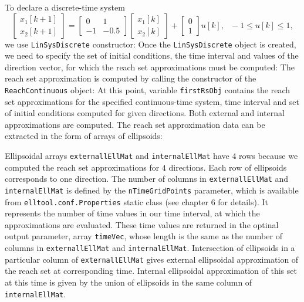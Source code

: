 To declare a discrete-time system
\[ \left[\begin{array}{c}
x_1[k+1]\\
x_2[k+1]\end{array}\right] = \left[\begin{array}{cc}
0 & 1\\
-1 & -0.5\end{array}\right]\left[\begin{array}{c}
x_1[k]\\
x_2[k]\end{array}\right] + \left[\begin{array}{c}
0\\
1\end{array}\right]u[k], ~~~ -1\leq u[k]\leq 1,\]
we use {\tt LinSysDiscrete} constructor:
Once the {\tt LinSysDiscrete} object is created, we need to specify the set
of initial conditions, the time interval and values of the direction vector,
for which the reach set approximations must be computed:
The reach set approximation is computed by calling the constructor
of the {\tt ReachContinuous} object:
At this point, variable {\tt firstRsObj} contains the reach set approximations for the
specified continuous-time system, time interval and set of initial conditions
computed for given directions. Both external and internal
approximations are computed.
The reach set approximation data can be
extracted in the form of arrays of ellipsoids:

Ellipsoidal arrays {\tt externallEllMat} and {\tt internalEllMat} have $4$ rows because we computed
the reach set approximations for $4$ directions. Each row of ellipsoids
corresponds to one direction. The number of columns in {\tt externallEllMat} and {\tt internalEllMat}
is defined by the {\tt nTimeGridPoints} parameter, which is available from {\tt elltool.conf.Properties}
static class (see chapter 6 for details). It represents the number of time values
in our time interval, at which the approximations are evaluated. These
time values are returned in the optinal output parameter, array {\tt timeVec},
whose length is the same as the number of columns in {\tt externallEllMat} and {\tt internalEllMat}.
Intersection of ellipsoids in a particular column of {\tt externallEllMat} gives
external ellipsoidal approximation of the reach set at corresponding time.
Internal ellipsoidal approximation of this set at this time is given by the
union of ellipsoids in the same column of {\tt internalEllMat}.

